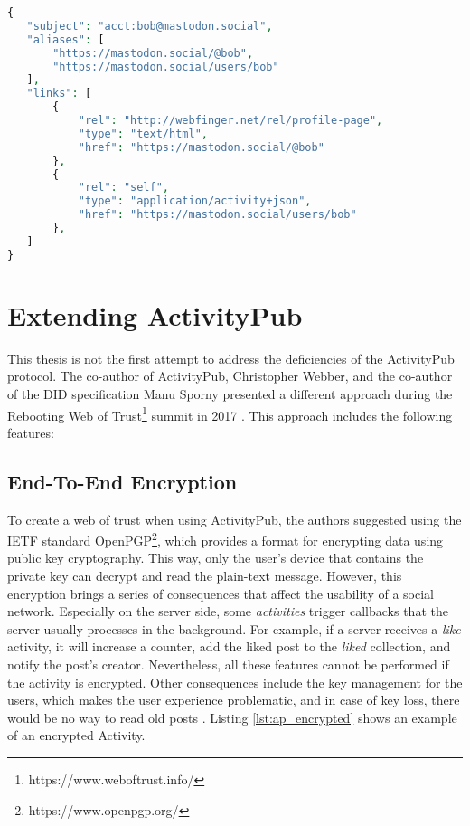 \lstset{style=JSONStyle}
\begin{lstlisting}[language=PHP, caption=Webfinger response, label=Webfinger response from mastodon.social, float=h]
{
   "subject": "acct:bob@mastodon.social",
   "aliases": [
       "https://mastodon.social/@bob",
       "https://mastodon.social/users/bob"
   ],
   "links": [
       {
           "rel": "http://webfinger.net/rel/profile-page",
           "type": "text/html",
           "href": "https://mastodon.social/@bob"
       },
       {
           "rel": "self",
           "type": "application/activity+json",
           "href": "https://mastodon.social/users/bob"
       },
   ]
}
\end{lstlisting}


\pagebreak
\section{Extending ActivityPub}\label{sec:extending_activitypub}

This thesis is not the first attempt to address the deficiencies of the ActivityPub protocol. The co-author of ActivityPub, Christopher Webber, and the co-author of the DID specification Manu Sporny presented a different approach during the Rebooting Web of Trust\footnote{https://www.weboftrust.info/} summit in 2017 \cite{webber_sporny_2017}. This approach includes the following features:

\subsection*{\textbf{End-To-End Encryption}}\label{subsec:e2e}

To create a web of trust when using ActivityPub, the authors suggested using the IETF standard OpenPGP\footnote{https://www.openpgp.org/}, which provides a format for encrypting data using public key cryptography. This way, only the user's device that contains the private key can decrypt and read the plain-text message. However, this encryption brings a series of consequences that affect the usability of a social network. Especially on the server side, some \emph{activities} trigger callbacks that the server usually processes in the background. For example, if a server receives a \emph{like} activity, it will increase a counter, add the liked post to the \emph{liked} collection, and notify the post's creator. Nevertheless, all these features cannot be performed if the activity is encrypted. Other consequences include the key management for the users, which makes the user experience problematic, and in case of key loss, there would be no way to read old posts \cite{webber_sporny_2017}. Listing \ref{lst:ap_encrypted} shows an example of an encrypted Activity.

